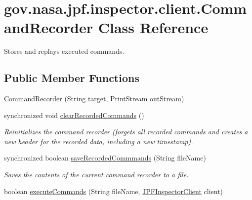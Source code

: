 \hypertarget{classgov_1_1nasa_1_1jpf_1_1inspector_1_1client_1_1_command_recorder}{}\section{gov.\+nasa.\+jpf.\+inspector.\+client.\+Command\+Recorder Class Reference}
\label{classgov_1_1nasa_1_1jpf_1_1inspector_1_1client_1_1_command_recorder}


Stores and replays executed commands.  


\subsection*{Public Member Functions}
\begin{DoxyCompactItemize}
\item 
\hyperlink{classgov_1_1nasa_1_1jpf_1_1inspector_1_1client_1_1_command_recorder_a4a3c23f4091a7c356ef4d559952ae012}{Command\+Recorder} (String \hyperlink{classgov_1_1nasa_1_1jpf_1_1inspector_1_1client_1_1_command_recorder_aefb118ba4cce5d17fabc04cf09e1ba22}{target}, Print\+Stream \hyperlink{classgov_1_1nasa_1_1jpf_1_1inspector_1_1client_1_1_command_recorder_a1cf50f0b50bd4acfb1116506243f450e}{out\+Stream})
\item 
synchronized void \hyperlink{classgov_1_1nasa_1_1jpf_1_1inspector_1_1client_1_1_command_recorder_aaa436ea4a008d221ec1fa5a47a8bf235}{clear\+Recorded\+Commands} ()
\begin{DoxyCompactList}\small\item\em Reinitializes the command recorder (forgets all recorded commands and creates a new header for the recorded data, including a new timestamp). \end{DoxyCompactList}\item 
synchronized boolean \hyperlink{classgov_1_1nasa_1_1jpf_1_1inspector_1_1client_1_1_command_recorder_aa0e6b0e5096d2420cac706f75e96e2cb}{save\+Recorded\+Commmands} (String file\+Name)
\begin{DoxyCompactList}\small\item\em Saves the contents of the current command recorder to a file. \end{DoxyCompactList}\item 
boolean \hyperlink{classgov_1_1nasa_1_1jpf_1_1inspector_1_1client_1_1_command_recorder_ae56f03817c386d8980cab5e6949c042c}{execute\+Commands} (String file\+Name, \hyperlink{classgov_1_1nasa_1_1jpf_1_1inspector_1_1client_1_1_j_p_f_inspector_client}{J\+P\+F\+Inspector\+Client} client)

\end{DoxyCompactItemize}
